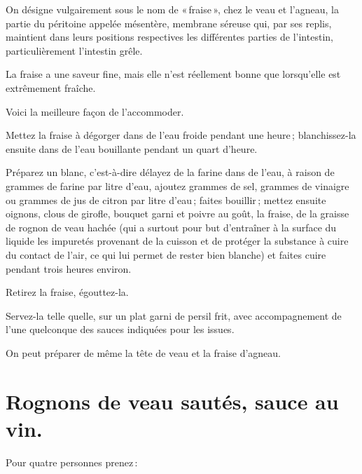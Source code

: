 On désigne vulgairement sous le nom de « fraise », chez le veau et l'agneau, la
partie du péritoine appelée mésentère, membrane séreuse qui, par ses replis,
maintient dans leurs positions respectives les différentes parties de
l'intestin, particulièrement l'intestin grêle.

La fraise a une saveur fine, mais elle n'est réellement bonne que lorsqu'elle
est extrêmement fraîche.

Voici la meilleure façon de l’accommoder.

Mettez la fraise à dégorger dans de l’eau froide pendant une heure ;
blanchissez-la ensuite dans de l'eau bouillante pendant un quart d'heure.

Préparez un blanc, c'est-à-dire délayez de la farine dans de l'eau, à raison de
{\mmm} grammes de farine par litre d'eau, ajoutez {\mmm} grammes de
sel, {\mmm} grammes de vinaigre ou {\mmm} grammes de jus de citron
par litre d'eau ; faites bouillir ; mettez ensuite oignons, clous de girofle,
bouquet garni et poivre au goût, la fraise, de la graisse de rognon de veau
hachée (qui a surtout pour but d'entraîner à la surface du liquide les
impuretés provenant de la cuisson et de protéger la substance à cuire du
contact de l'air, ce qui lui permet de rester bien blanche) et faites cuire
pendant trois heures environ.

Retirez la fraise, égouttez-la.

Servez-la telle quelle, sur un plat garni de persil frit, avec accompagnement de
l'une quelconque des sauces indiquées pour les issues.

\sk

On peut préparer de même la tête de veau et la fraise d'agneau.

\newpage
\section*{\centering Rognons de veau sautés, sauce au vin.}
{}

Pour quatre personnes prenez :

\medskip


